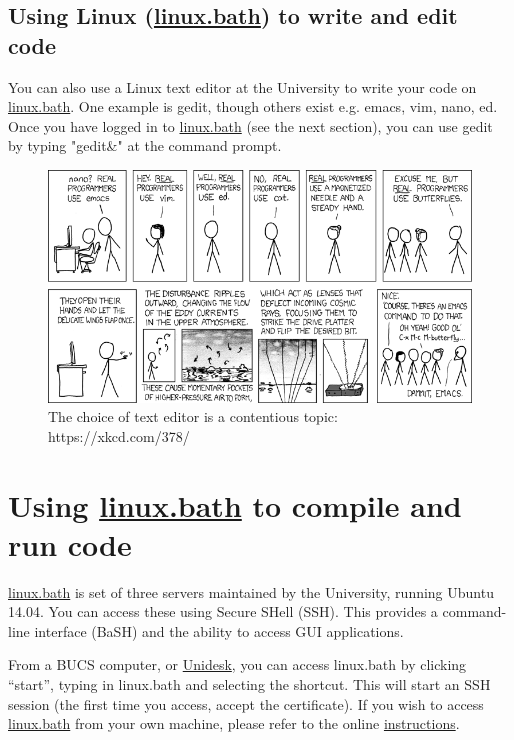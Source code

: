 \documentclass[12pt, a4paper, oneside]{article}
\begin{document}
\subsection{Using Linux (\href{http://www.bath.ac.uk/guides/connecting-to-linux-bath/}{linux.bath}) to write and edit code}
You can also use a Linux text editor at the University to write your code on \href{http://www.bath.ac.uk/guides/connecting-to-linux-bath/}{linux.bath}. One example is gedit, though others exist e.g. emacs, vim, nano, ed.
Once you have logged in to \href{http://www.bath.ac.uk/guides/connecting-to-linux-bath/}{linux.bath} (see the next section), you can use gedit by typing "gedit\&" at the command prompt.
\begin{figure}[h!]
  \caption{The choice of text editor is a contentious topic: https://xkcd.com/378/}
  \centering
    \includegraphics[width=\textwidth]{real_programmers.png}
\end{figure}

\section{Using \href{http://www.bath.ac.uk/guides/connecting-to-linux-bath/}{linux.bath} to compile and run code}
\href{http://www.bath.ac.uk/guides/connecting-to-linux-bath/}{linux.bath} is set of three servers maintained by the University, running Ubuntu 14.04.
You can access these using Secure SHell (SSH).
This provides a command-line interface (BaSH) and the ability to access GUI applications.

From a BUCS computer, or \href{http://www.bath.ac.uk/bucs/tools/windowsterminalservices/}{Unidesk}, you can access linux.bath by clicking ``start'', typing in linux.bath and selecting the shortcut.
This will start an SSH session (the first time you access, accept the certificate).
If you wish to access \href{http://www.bath.ac.uk/guides/connecting-to-linux-bath/}{linux.bath} from your own machine, please refer to the online \href{http://www.bath.ac.uk/bucs/networking/ssh.html}{instructions}.
\end{document}
